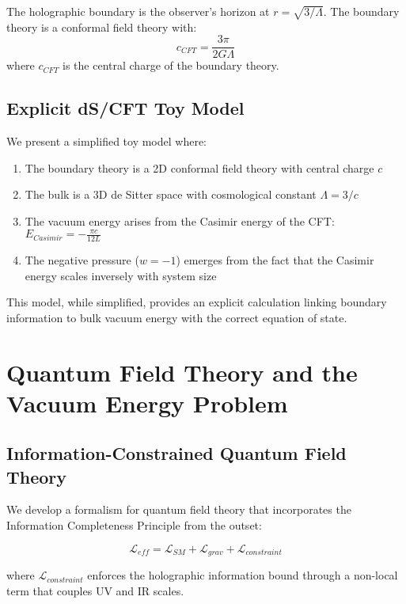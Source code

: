 \documentclass[12pt]{article}
\theoremstyle{plain}
\theoremstyle{definition}
\theoremstyle{remark}
\begin{document}
The holographic boundary is the observer's horizon at $r = \sqrt{3/\Lambda}$. The boundary theory is a conformal field theory with:
\begin{equation}
c_{CFT} = \frac{3\pi}{2G\Lambda}
\end{equation}
where $c_{CFT}$ is the central charge of the boundary theory.

\subsection{Explicit dS/CFT Toy Model}

We present a simplified toy model where:

\begin{enumerate}
\item The boundary theory is a 2D conformal field theory with central charge $c$
\item The bulk is a 3D de Sitter space with cosmological constant $\Lambda = 3/c$
\item The vacuum energy arises from the Casimir energy of the CFT: $E_{Casimir} = -\frac{\pi c}{12 L}$
\item The negative pressure ($w = -1$) emerges from the fact that the Casimir energy scales inversely with system size
\end{enumerate}

This model, while simplified, provides an explicit calculation linking boundary information to bulk vacuum energy with the correct equation of state.

\section{Quantum Field Theory and the Vacuum Energy Problem}

\subsection{Information-Constrained Quantum Field Theory}

We develop a formalism for quantum field theory that incorporates the Information Completeness Principle from the outset:

\begin{equation}
\mathcal{L}_{eff} = \mathcal{L}_{SM} + \mathcal{L}_{grav} + \mathcal{L}_{constraint}
\end{equation}

where $\mathcal{L}_{constraint}$ enforces the holographic information bound through a non-local term that couples UV and IR scales.
\end{document}
